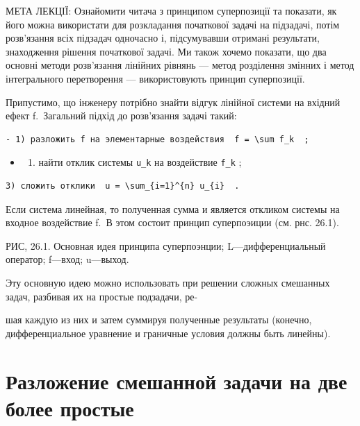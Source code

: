 \documentclass[
  ukrainian,
]{article}
\providecommand{\tightlist}{%
  \setlength{\itemsep}{0pt}\setlength{\parskip}{0pt}}
\begin{document}
МЕТА ЛЕКЦІЇ: Ознайомити читача з принципом суперпозиції та показати, як
його можна використати для розкладання початкової задачі на підзадачі,
потім розв'язання всіх підзадач одночасно і, підсумувавши отримані
результати, знаходження рішення початкової задачі. Ми також хочемо
показати, що два основні методи розв'язання лінійних рівнянь --- метод
розділення змінних і метод інтегрального перетворення --- використовують
принцип суперпозиції.

Припустимо, що інженеру потрібно знайти відгук лінійної системи на
вхідний ефект f.~Загальний підхід до розв'язання задачі такий:

\begin{verbatim}
- 1) разложить f на элементарные воздействия  f = \sum f_k  ;
\end{verbatim}

\begin{itemize}
\tightlist
\item
  \begin{enumerate}
  \def\labelenumi{\arabic{enumi})}
  \setcounter{enumi}{1}
  \tightlist
  \item
    найти отклик системы \texttt{u\_k} на воздействие \texttt{f\_k} ;
  \end{enumerate}
\end{itemize}

\begin{verbatim}
3) сложить отклики  u = \sum_{i=1}^{n} u_{i}  .
\end{verbatim}

Если система линейная, то полученная сумма и является откликом системы
на входное воздействие f.~В этом состоит принцип суперпоэиции (см. рнс.
26.1).

РИС, 26.1. Основная идея принципа суперпоэнции; L---дифференциальный
оператор; f---вход; u---выход.

Эту основную идею можно использовать при решении сложных смешанных
задач, разбивая их на простые подзадачи, ре-

шая каждую из них и затем суммируя полученные результаты (конечно,
дифференциальное уравнение и граничные условия должны быть линейны).

\section{Разложение смешанной задачи на две более
простые}\label{ux440ux430ux437ux43bux43eux436ux435ux43dux438ux435-ux441ux43cux435ux448ux430ux43dux43dux43eux439-ux437ux430ux434ux430ux447ux438-ux43dux430-ux434ux432ux435-ux431ux43eux43bux435ux435-ux43fux440ux43eux441ux442ux44bux435}
\end{document}
